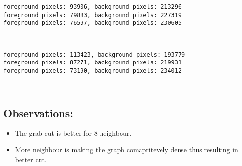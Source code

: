 \documentclass[11pt]{article}
\providecommand{\tightlist}{%
      \setlength{\itemsep}{0pt}\setlength{\parskip}{0pt}}
\begin{document}
    \begin{Verbatim}[commandchars=\\\{\}]
foreground pixels: 93906, background pixels: 213296
foreground pixels: 79883, background pixels: 227319
foreground pixels: 76597, background pixels: 230605

    \end{Verbatim}

    \begin{center}
    \end{center}
    { \hspace*{\fill} \\}
    
    \begin{Verbatim}[commandchars=\\\{\}]
foreground pixels: 113423, background pixels: 193779
foreground pixels: 87271, background pixels: 219931
foreground pixels: 73190, background pixels: 234012

    \end{Verbatim}

    \begin{center}
    \end{center}
    { \hspace*{\fill} \\}
    
    \hypertarget{observations}{%
\subsection{Observations:}\label{observations}}

\begin{itemize}
\tightlist
\item
  The grab cut is better for 8 neighbour.
\item
  More neighbour is making the graph comapritevely dense thus resulting
  in better cut.
\end{itemize}


    
    
    
    
\end{document}
